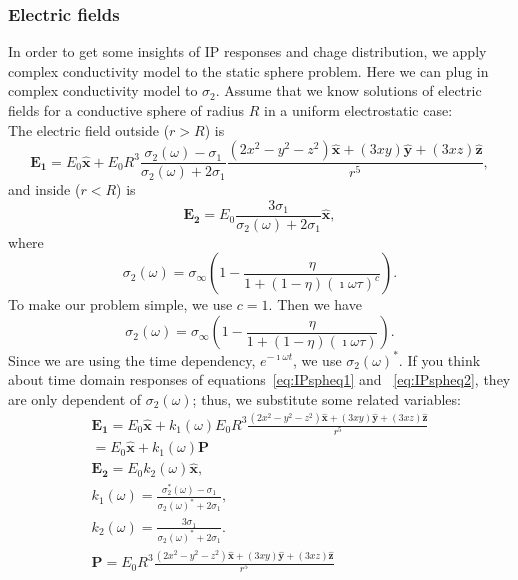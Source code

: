 \documentclass[a4paper, 11pt]{article}
\begin{document}
\subsubsection{Electric fields}
In order to get some insights of IP responses and chage distribution, we apply complex conductivity model to the static sphere problem.
Here we can plug in complex conductivity model to $\sigma_2$. Assume that we know solutions of electric fields for a conductive sphere of radius $R$ in a uniform electrostatic case: \\
The electric field outside ($r>R$) is 
\begin{equation}
	\mathbf{E_1} = E_0\mathbf{\hat{x}}+E_0R^3\frac{\sigma_2(\omega)-\sigma_1}{\sigma_2(\omega)+2\sigma_1}\frac{(2x^2-y^2-z^2)\mathbf{\hat{x}}+(3xy)\mathbf{\hat{y}}+(3xz)\mathbf{\hat{z}}}{r^5},
\label{eq:IPspheq1}		
\end{equation}
and inside ($r<R$) is
\begin{equation}
	\mathbf{E_2} = E_0\frac{3\sigma_1}{\sigma_2(\omega)+2\sigma_1}\mathbf{\hat{x}},
\label{eq:IPspheq2}		
\end{equation}
where 
\begin{displaymath}
	\sigma_2(\omega) = \sigma_{\infty}(1-\frac{\eta}{1+(1-\eta)(\imath\omega\tau)^c}).
\end{displaymath}
To make our problem simple, we use $c=1$. Then we have
\begin{displaymath}
	\sigma_2(\omega) = \sigma_{\infty}(1-\frac{\eta}{1+(1-\eta)(\imath\omega\tau)}).
\end{displaymath}
Since we are using the time dependency, $e^{-\imath\omega t}$, we use $\sigma_2(\omega)^*$. If you think about time domain responses of equations~\ref{eq:IPspheq1} and ~\ref{eq:IPspheq2}, they are only dependent of $\sigma_2(\omega)$; thus, we substitute some related variables:
\begin{align*}
	\mathbf{E_1} = E_0\mathbf{\hat{x}}+k_1(\omega)E_0R^3\frac{(2x^2-y^2-z^2)\mathbf{\hat{x}}+(3xy)\mathbf{\hat{y}}+(3xz)\mathbf{\hat{z}}}{r^5}\\
	=E_0\mathbf{\hat{x}}+k_1(\omega)\mathbf{P} \\
	\mathbf{E_2} = E_0k_2(\omega)\mathbf{\hat{x}},\\
	k_1(\omega)=\frac{\sigma_2^*(\omega)-\sigma_1}{\sigma_2(\omega)^*+2\sigma_1},\\
	k_2(\omega)=\frac{3\sigma_1}{\sigma_2(\omega)^*+2\sigma_1}.\\
	\mathbf{P} = E_0R^3\frac{(2x^2-y^2-z^2)\mathbf{\hat{x}}+(3xy)\mathbf{\hat{y}}+(3xz)\mathbf{\hat{z}}}{r^5}
\end{align*}
\end{document}
